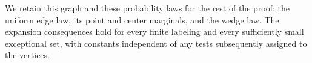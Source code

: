 We retain this graph and these probability laws for the rest of the
proof: the uniform edge law, its point and center marginals, and the
wedge law. The expansion consequences hold for every finite labeling
and every sufficiently small exceptional set, with constants independent
of any tests subsequently assigned to the vertices.
